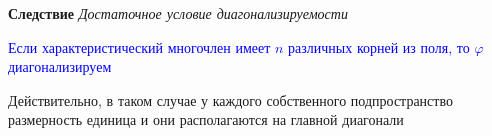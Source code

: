      \textbf{Следствие} \textit{Достаточное условие диагонализируемости}

    \textcolor{blue}{Если характеристический многочлен имеет $n$ различных корней из поля, то $\varphi$
        диагонализируем}

    Действительно, в таком случае у каждого собственного подпространство размерность единица и они располагаются на
    главной диагонали